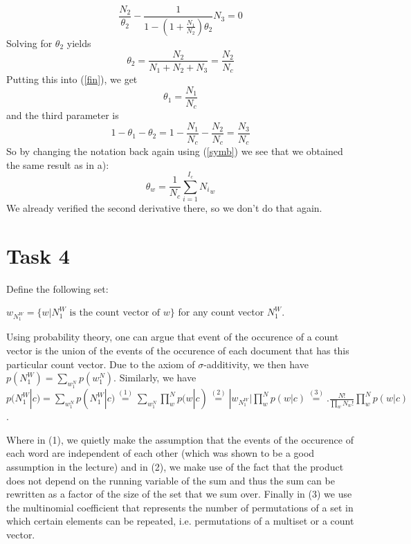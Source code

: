 \documentclass[%
   11pt,              %
   ngerman,           %
   a4paper,           %
   DIV11,             %
]{scrartcl}%
\begin{document}
\begin{equation*}
	\frac{N_2}{\theta_2} - \frac{1}{1 - (1 + \frac{N_1}{N_2})\theta_2}N_3 = 0
\end{equation*}
Solving for $\theta_2$ yields
\begin{equation*}
	\theta_2 = \frac{N_2}{N_1 + N_2 + N_3} = \frac{N_2}{N_c}
\end{equation*}
Putting this into (\ref{fin}), we get
\begin{equation*}
	\theta_1 =  \frac{N_1}{N_c}
\end{equation*}
and the third parameter is
\begin{equation*}
	1 - \theta_1 - \theta_2 = 1 - \frac{N_1}{N_c} - \frac{N_2}{N_c} = \frac{N_3}{N_c}
\end{equation*}
So by changing the notation back again using (\ref{symb}) we see that we obtained the same result as in a):
\begin{equation*}
	\theta_w = \frac{1}{N_c} \sum_{i=1}^{I_c} {N_i}_w
\end{equation*}
We already verified the second derivative there, so we don't do that again.
\section*{Task 4}
Define the following set:

$w_{N_1^W} = \{w | N_1^W \text{ is the count vector of } w\}$ for any count vector $N_1^W$.

Using probability theory, one can argue that event of the occurence of a count vector is the union of the events of the occurence of each document that has this particular count vector. Due to the axiom of $\sigma$-additivity, we then have $p(N_1^W) =\displaystyle\sum_{w_1^N} p(w_1^N)$. Similarly, we have 
$p(N_1^W|c)= \displaystyle\sum_{w_1^N} p(N_1^W|c) \stackrel{(1)}{=}
\displaystyle\sum_{w_1^N} \displaystyle\prod_{w}^N p(w|c)\stackrel{(2)}{=}
|w_{N_1^W}| \displaystyle\prod_{w}^N p(w|c)\stackrel{(3)}{=}.
\frac{N!}{\prod_w N_w!} \displaystyle\prod_{w}^N p(w|c)$.

Where in (1), we quietly make the assumption that the events of the occurence of each word are independent of each other (which was shown to be a good assumption in the lecture) and in (2), we make use of the fact that the product does not depend on the running variable of the sum and thus the sum can be rewritten as a factor of the size of the set that we sum over. Finally in (3) we use the multinomial coefficient that represents the number of permutations of a set in which certain elements can be repeated, i.e. permutations of a multiset or a count vector.
\end{document}
